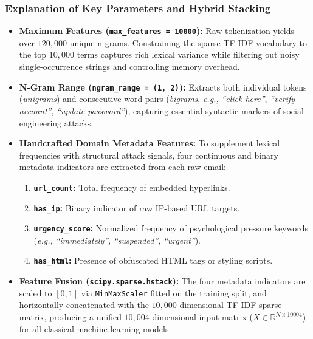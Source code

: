 \documentclass[conference]{IEEEtran}
\begin{document}
\subsubsection{Explanation of Key Parameters and Hybrid Stacking}
\begin{itemize}
    \item \textbf{Maximum Features (\texttt{max\_features = 10000}):} Raw tokenization yields over $120,000$ unique n-grams. Constraining the sparse TF-IDF vocabulary to the top $10,000$ terms captures rich lexical variance while filtering out noisy single-occurrence strings and controlling memory overhead.

    \item \textbf{N-Gram Range (\texttt{ngram\_range = (1, 2)}):} Extracts both individual tokens (\textit{unigrams}) and consecutive word pairs (\textit{bigrams}, \textit{e.g.,} \textit{``click here''}, \textit{``verify account''}, \textit{``update password''}), capturing essential syntactic markers of social engineering attacks.

    \item \textbf{Handcrafted Domain Metadata Features:} To supplement lexical frequencies with structural attack signals, four continuous and binary metadata indicators are extracted from each raw email:
    \begin{enumerate}
        \item \textbf{\texttt{url\_count}:} Total frequency of embedded hyperlinks.
        \item \textbf{\texttt{has\_ip}:} Binary indicator of raw IP-based URL targets.
        \item \textbf{\texttt{urgency\_score}:} Normalized frequency of psychological pressure keywords (\textit{e.g.,} \textit{``immediately''}, \textit{``suspended''}, \textit{``urgent''}).
        \item \textbf{\texttt{has\_html}:} Presence of obfuscated HTML tags or styling scripts.
    \end{enumerate}

    \item \textbf{Feature Fusion (\texttt{scipy.sparse.hstack}):} The four metadata indicators are scaled to $[0, 1]$ via \texttt{MinMaxScaler} fitted on the training split, and horizontally concatenated with the $10,000$-dimensional TF-IDF sparse matrix, producing a unified $10,004$-dimensional input matrix ($X \in \mathbb{R}^{N \times 10004}$) for all classical machine learning models.
\end{itemize}
\end{document}
